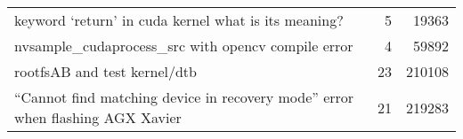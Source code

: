 \begin{longtable}{p{}rr}
    keyword ‘return’ in cuda kernel what is its meaning?                                                                               & 5       & 19363  \\
    nvsample\_cudaprocess\_src with opencv compile error                                                                               & 4       & 59892  \\
    rootfsAB and test kernel/dtb                                                                                                       & 23      & 210108 \\
    “Cannot find matching device in recovery mode” error when flashing AGX Xavier                                                      & 21      & 219283
    \label{tab:forum_posts}
\end{longtable}